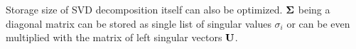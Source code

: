 Storage size of SVD decomposition itself can also be optimized. $\mathbf{\Sigma}$ being a diagonal matrix can be stored as single list of singular values $\sigma_{i}$ or can be even multiplied with the matrix of left singular vectors $\mathbf{U}$.

